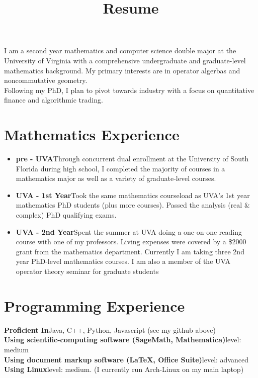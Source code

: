 \documentclass[12pt,letterpaper,sans]{moderncv}
\title{Resume}
\begin{document}
\makecvtitle %
\vspace*{-1.5em}



\begin{center}
  I am a second year mathematics and computer science double major at the University of Virginia with a comprehensive undergraduate and graduate-level mathematics background. My primary interests are in operator algerbas and noncommutative geometry. \\
\vspace{1.5em}
  Following my PhD, I plan to pivot towards industry with a focus on quantitative finance and algorithmic trading.
\end{center}

\section{Mathematics Experience}

\begin{itemize}
  \item \textbf{pre - UVA}\quad Through concurrent dual enrollment at the University of South Florida during high school, I completed the majority of courses in a mathematics major as well as a variety of graduate-level courses.
  \item \textbf{UVA - 1st Year}\quad Took the same mathematics courseload as UVA's 1st year mathematics PhD students (plus more courses). Passed the analysis (real \& complex) PhD qualifying exams.
  \item \textbf{UVA - 2nd Year}\quad Spent the summer at UVA doing a one-on-one reading course with one of my professors. Living expenses were covered by a \$2000 grant from the mathematics department. Currently I am taking three 2nd year PhD-level mathematics courses. I am also a member of the UVA operator theory seminar for graduate students
\end{itemize}


\section{Programming Experience}
\textbf{Proficient In}\quad Java, C++, Python, Javascript (see my github above) \\
\textbf{Using scientific-computing software (SageMath, Mathematica)}\quad level: medium \\
\textbf{Using document markup software (\LaTeX, Office Suite)}\quad level: advanced \\
\textbf{Using Linux}\quad level: medium. (I currently run Arch-Linux on my main laptop)
\end{document}
